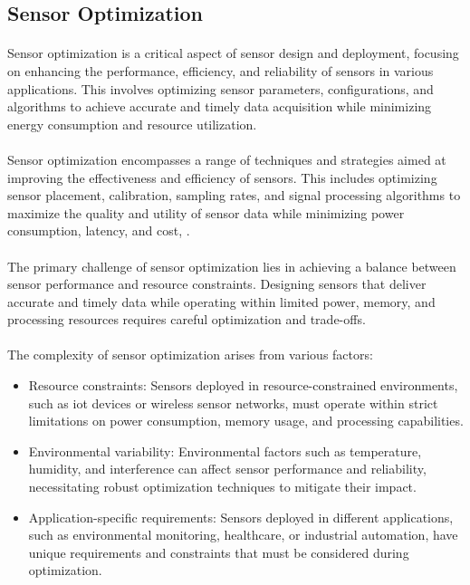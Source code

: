     
    \subsection{Sensor Optimization}
    
        \paragraph{}
        Sensor optimization is a critical aspect of sensor design and deployment, focusing on enhancing the performance, efficiency, and reliability of sensors in various applications. This involves optimizing sensor parameters, configurations, and algorithms to achieve accurate and timely data acquisition while minimizing energy consumption and resource utilization.

        \paragraph{}
        Sensor optimization encompasses a range of techniques and strategies aimed at improving the effectiveness and efficiency of sensors. This includes optimizing sensor placement, calibration, sampling rates, and signal processing algorithms to maximize the quality and utility of sensor data while minimizing power consumption, latency, and cost\cite{ultraLowPowerIntegratedCircuitDesign}, \cite{EHandEE}.

        \paragraph{}
        The primary challenge of sensor optimization lies in achieving a balance between sensor performance and resource constraints. Designing sensors that deliver accurate and timely data while operating within limited power, memory, and processing resources requires careful optimization and trade-offs.

        \paragraph{}
        The complexity of sensor optimization arises from various factors:
        \begin{itemize}
            \item Resource constraints: Sensors deployed in resource-constrained environments, such as \gls{iot} devices or wireless sensor networks, must operate within strict limitations on power consumption, memory usage, and processing capabilities.
            \item Environmental variability: Environmental factors such as temperature, humidity, and interference can affect sensor performance and reliability, necessitating robust optimization techniques to mitigate their impact.
            \item Application-specific requirements: Sensors deployed in different applications, such as environmental monitoring, healthcare, or industrial automation, have unique requirements and constraints that must be considered during optimization.
        \end{itemize}

